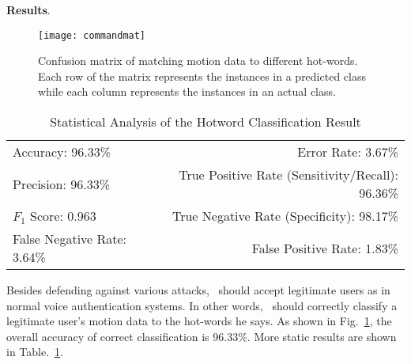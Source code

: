 \textbf{Results}.
\begin{figure}[h]
	\centering
	\texttt{[image: commandmat]}
	\caption{Confusion matrix of matching motion data to different hot-words. Each row of the matrix represents the instances in a predicted class while each column represents the instances in an actual class.}
	\label{fig:commadmat}
\end{figure}
\begin{table}[t]
	\caption{Statistical Analysis of the Hotword Classification Result}
	\label{tab:commandTable}
	\centering
	\begin{tabular}{lr}
		\toprule
		Accuracy: 96.33\% & \hspace{-.55in} Error Rate: 3.67\% \\
		Precision: 96.33\% & \hspace{-.55in} True Positive Rate (Sensitivity/Recall): 96.36\% \\
		$F_1$ Score: 0.963 & \hspace{-.55in} True Negative Rate (Specificity): 98.17\% \\
		False Negative Rate: 3.64\%  & \hspace{-.55in} False Positive Rate: 1.83\% \\
		\bottomrule
	\end{tabular}
\end{table}

Besides defending against various attacks, \shortname~should accept legitimate users as in normal voice authentication systems. In other words, \shortname~should correctly classify a legitimate user's motion data to the hot-words he says. As shown in Fig.~\ref{fig:commadmat}, the overall accuracy of correct classification is 96.33\%.  More static results are shown in Table.~\ref{tab:commandTable}.



